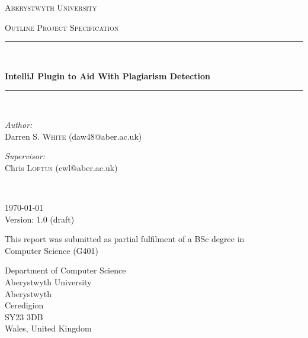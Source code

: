 \begin{titlepage}
  \begin{center}
    \vspace*{.06\textheight}
    {\scshape\LARGE Aberystwyth University\par}\vspace{1.5cm}
    \textsc{\Large Outline Project Specification}\\[0.5cm]

    \rule{.9\linewidth}{.6pt} \\[0.4cm]
    {\huge \bfseries IntelliJ Plugin to Aid With Plagiarism Detection\par}\vspace{0.4cm}
    \rule{.9\linewidth}{.6pt} \\[1.5cm]

    \begin{minipage}[t]{0.4\textwidth}
    \begin{flushleft} \large
    \emph{Author:}\\
    Darren S. \textsc{White} (daw48@aber.ac.uk)
    \end{flushleft}
    \end{minipage}
    \begin{minipage}[t]{0.4\textwidth}
    \begin{flushright} \large
    \emph{Supervisor:} \\
    Chris \textsc{Loftus} (cwl@aber.ac.uk)
    \end{flushright}
    \end{minipage}\\[1cm]

    \vfill

    \large \today\\[0.3cm]
    Version: 1.0 (draft)\\[1cm]

    \vfill

    \large This report was submitted as partial fulfilment of a BSc degree in\\[0.3cm]
    Computer Science (G401)\\[2cm]

    \vfill

    \begin{minipage}[t]{\textwidth}
    \begin{flushleft} \large
    Department of Computer Science\\
    Aberystwyth University\\
    Aberystwyth\\
    Ceredigion\\
    SY23 3DB\\
    Wales, United Kingdom\\
    \end{flushleft}
    \end{minipage}

    \vfill
  \end{center}
\end{titlepage}
